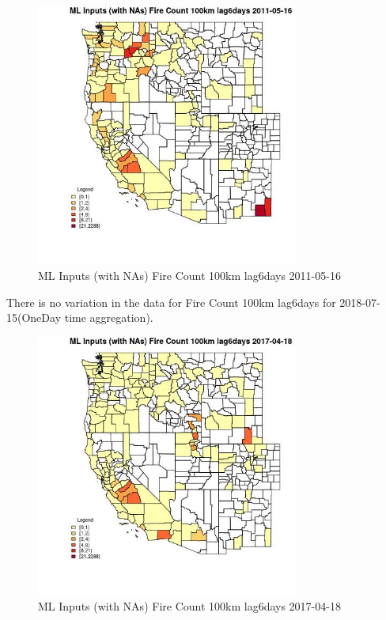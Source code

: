 \begin{figure} 
\centering  
\includegraphics[width=0.77\textwidth]{Code_Outputs/Report_ML_input_PM25_Step4_part_e_de_duplicated_aves_compiled_2019-05-21wNAs_CountyFire_Count_100km_lag6daysMean2011-05-16.jpg} 
\caption{\label{fig:Report_ML_input_PM25_Step4_part_e_de_duplicated_aves_compiled_2019-05-21wNAsCountyFire_Count_100km_lag6daysMean2011-05-16}ML Inputs (with NAs) Fire Count 100km lag6days 2011-05-16} 
\end{figure} 
 

There is no variation in the data for Fire Count 100km lag6days for 2018-07-15(OneDay time aggregation). 
 

\begin{figure} 
\centering  
\includegraphics[width=0.77\textwidth]{Code_Outputs/Report_ML_input_PM25_Step4_part_e_de_duplicated_aves_compiled_2019-05-21wNAs_CountyFire_Count_100km_lag6daysMean2017-04-18.jpg} 
\caption{\label{fig:Report_ML_input_PM25_Step4_part_e_de_duplicated_aves_compiled_2019-05-21wNAsCountyFire_Count_100km_lag6daysMean2017-04-18}ML Inputs (with NAs) Fire Count 100km lag6days 2017-04-18} 
\end{figure} 
 

